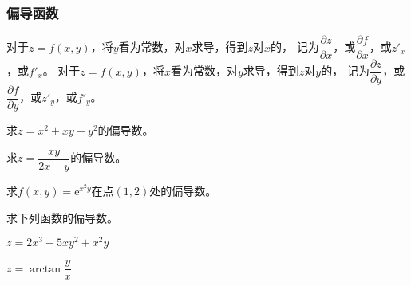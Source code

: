 \documentclass[14pt,notheorems,leqno,xcolor={rgb}]{beamer} %
\begin{document}
\begin{frame}
\frametitle{偏导函数}
对于$z=f(x,y)$，将$y$看为常数，对$x$求导，得到$z$对$x$的，
记为$\dfrac{\partial z}{\partial x}$，\pause 或$\dfrac{\partial f}{\partial x}$，或$z'_x$，或$f'_x$。
\vpause
对于$z=f(x,y)$，将$x$看为常数，对$y$求导，得到$z$对$y$的，
记为$\dfrac{\partial z}{\partial y}$，\pause 或$\dfrac{\partial f}{\partial y}$，或$z'_y$，或$f'_y$。
\end{frame}

\begin{frame}
\begin{example}
求$z=x^2+xy+y^2$的偏导数。
\end{example}
\pause
\begin{example}
求$z=\dfrac{xy}{2x-y}$的偏导数。
\end{example}
\pause
\begin{example}
求$f(x,y)=\mathrm{e}^{x^2y}$在点$(1,2)$处的偏导数。
\end{example}
\vpause
\begin{exercise}
求下列函数的偏导数。
\begin{enumlite}
  \item $z=2x^3-5xy^2+x^2y$
  \item $z=\arctan\dfrac{y}x$
\end{enumlite}
\end{exercise}
\end{frame}
\end{document}
